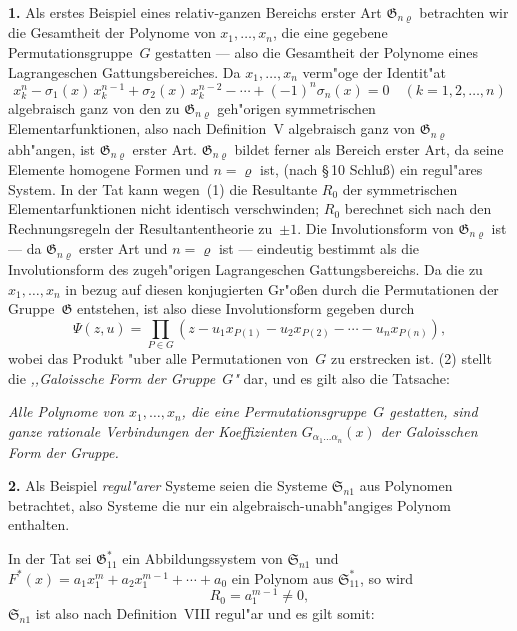 \documentclass[11pt,a4paper]{article}
\begin{document}
\smallskip
\noindent
\textbf{1.} Als erstes Beispiel eines relativ-ganzen Bereichs erster Art
$\mathfrak{G}_{n\varrho}$ betrachten wir die Gesamtheit der Polynome von $x_{1},\dots,x_{n}$, die
eine gegebene Permutationsgruppe~$G$ gestatten --- also die Gesamtheit der
Polynome eines Lagrangeschen Gattungsbereiches. Da $x_{1},\dots,x_{n}$ verm"{o}ge
der Identit"{a}t
\begin{equation}
x_{k}^{n}-\sigma_{1}(x)\,x_{k}^{n-1}+\sigma_{2}(x)\,x_{k}^{n-2}-\cdots+(-1)^{n}\sigma_{n}(x)=0
\quad(k=1,2,\dots,n)
\tag{1}
\end{equation}
algebraisch ganz von den zu $\mathfrak{G}_{n\varrho}$ geh"{o}rigen symmetrischen Elementarfunktionen,
also nach Definition~V algebraisch ganz von $\mathfrak{G}_{n\varrho}$ abh"{a}ngen, ist $\mathfrak{G}_{n\varrho}$
erster Art. $\mathfrak{G}_{n\varrho}$ bildet ferner als Bereich erster Art, da seine Elemente
homogene Formen und $n=\varrho$ ist, (nach \S\,10 Schlu\ss{}) ein regul"{a}res System.
In der Tat kann wegen~(1) die Resultante $R_{0}$ der symmetrischen
Elementarfunktionen nicht identisch verschwinden; $R_{0}$ berechnet sich nach
den Rechnungsregeln der Resultantentheorie zu~$\pm 1$. Die Involutionsform
von $\mathfrak{G}_{n\varrho}$ ist --- da $\mathfrak{G}_{n\varrho}$ erster Art und $n=\varrho$ ist --- eindeutig bestimmt
als die Involutionsform des zugeh"{o}rigen Lagrangeschen Gattungsbereichs.
Da die zu $x_{1},\dots,x_{n}$ in bezug auf diesen konjugierten Gr"{o}\ss{}en durch die
Permutationen der Gruppe~$\mathfrak{G}$ entstehen, ist also diese Involutionsform
gegeben durch
\begin{equation}
\Psi(z,u)=\prod_{P\in G}(z-u_{1}x_{P(1)}-u_{2}x_{P(2)}-\cdots-u_{n}x_{P(n)}),
\tag{2}
\end{equation}
wobei das Produkt "{u}ber alle Permutationen von~$G$ zu erstrecken ist.
(2) stellt die \emph{,,Galoissche Form der Gruppe~$G$"{}} dar, und es gilt also die
Tatsache:

\smallskip
\emph{Alle Polynome von $x_{1},\dots,x_{n}$, die eine Permutationsgruppe~$G$ gestatten,
sind ganze rationale Verbindungen der Koeffizienten $G_{\alpha_{1}\dots\alpha_{n}}(x)$
der Galoisschen Form der Gruppe.}

\smallskip
\noindent
\textbf{2.} Als Beispiel \emph{regul"{a}rer} Systeme seien die Systeme $\mathfrak{S}_{n1}$ aus
Polynomen betrachtet, also Systeme die nur ein algebraisch-unabh"{a}ngiges
Polynom enthalten.

In der Tat sei $\mathfrak{G}_{11}^{*}$ ein Abbildungssystem von $\mathfrak{S}_{n1}$ und
$F^{*}(x)=a_{1}x_{1}^{m}+a_{2}x_{1}^{m-1}+\cdots+a_{0}$
ein Polynom aus $\mathfrak{S}_{11}^{*}$, so wird
\begin{equation}
R_{0}=a_{1}^{m-1}\neq 0,
\tag{3}
\end{equation}
$\mathfrak{S}_{n1}$ ist also nach Definition~VIII regul"{a}r und es gilt somit:
\end{document}
